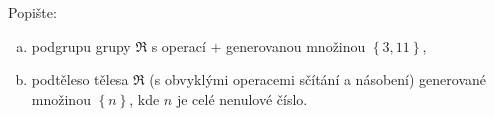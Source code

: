 Popište:
\begin{enumerate}[a)]
  \item podgrupu grupy $\Re$ s operací $+$ generovanou množinou $\left \{ 3,11
  \right \}$,
  \item podtěleso tělesa $\Re$ (s obvyklými operacemi sčítání a násobení)
  generované množinou $\left \{ n \right \}$, kde $n$ je celé nenulové číslo.
\end{enumerate}

